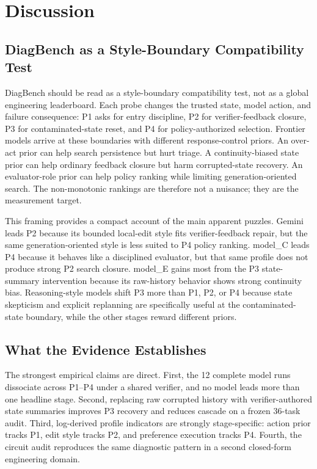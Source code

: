 \section{Discussion}

\subsection{DiagBench as a Style-Boundary Compatibility Test}

DiagBench should be read as a style-boundary compatibility test, not as a global engineering leaderboard. Each probe changes the trusted state, model action, and failure consequence: P1 asks for entry discipline, P2 for verifier-feedback closure, P3 for contaminated-state reset, and P4 for policy-authorized selection. Frontier models arrive at these boundaries with different response-control priors. An over-act prior can help search persistence but hurt triage. A continuity-biased state prior can help ordinary feedback closure but harm corrupted-state recovery. An evaluator-role prior can help policy ranking while limiting generation-oriented search. The non-monotonic rankings are therefore not a nuisance; they are the measurement target.

This framing provides a compact account of the main apparent puzzles. Gemini leads P2 because its bounded local-edit style fits verifier-feedback repair, but the same generation-oriented style is less suited to P4 policy ranking. model_C leads P4 because it behaves like a disciplined evaluator, but that same profile does not produce strong P2 search closure. model_E gains most from the P3 state-summary intervention because its raw-history behavior shows strong continuity bias. Reasoning-style models shift P3 more than P1, P2, or P4 because state skepticism and explicit replanning are specifically useful at the contaminated-state boundary, while the other stages reward different priors.

\subsection{What the Evidence Establishes}

The strongest empirical claims are direct. First, the 12 complete model runs dissociate across P1--P4 under a shared verifier, and no model leads more than one headline stage. Second, replacing raw corrupted history with verifier-authored state summaries improves P3 recovery and reduces cascade on a frozen 36-task audit. Third, log-derived profile indicators are strongly stage-specific: action prior tracks P1, edit style tracks P2, and preference execution tracks P4. Fourth, the circuit audit reproduces the same diagnostic pattern in a second closed-form engineering domain.

